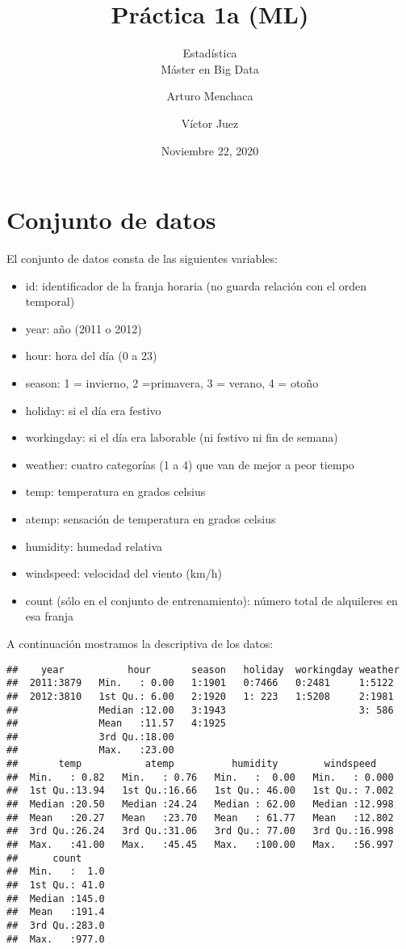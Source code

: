 \documentclass[
]{article}
\title{Práctica 1a (ML)}
\subtitle{Estadística\\
Máster en Big Data}
\author{Arturo Menchaca \and Víctor Juez}
\date{Noviembre 22, 2020}
\providecommand{\tightlist}{%
  \setlength{\itemsep}{0pt}\setlength{\parskip}{0pt}}
\begin{document}
\maketitle

\newpage
\tableofcontents
\newpage

\hypertarget{conjunto-de-datos}{%
\section{Conjunto de datos}\label{conjunto-de-datos}}

El conjunto de datos consta de las siguientes variables:

\begin{itemize}
\tightlist
\item
  id: identificador de la franja horaria (no guarda relación con el
  orden temporal)
\item
  year: año (2011 o 2012)
\item
  hour: hora del día (0 a 23)
\item
  season: 1 = invierno, 2 =primavera, 3 = verano, 4 = otoño
\item
  holiday: si el día era festivo
\item
  workingday: si el día era laborable (ni festivo ni fin de semana)
\item
  weather: cuatro categorías (1 a 4) que van de mejor a peor tiempo
\item
  temp: temperatura en grados celsius
\item
  atemp: sensación de temperatura en grados celsius
\item
  humidity: humedad relativa
\item
  windspeed: velocidad del viento (km/h)
\item
  count (sólo en el conjunto de entrenamiento): número total de
  alquileres en esa franja
\end{itemize}

A continuación mostramos la descriptiva de los datos:

\begin{verbatim}
##    year           hour       season   holiday  workingday weather 
##  2011:3879   Min.   : 0.00   1:1901   0:7466   0:2481     1:5122  
##  2012:3810   1st Qu.: 6.00   2:1920   1: 223   1:5208     2:1981  
##              Median :12.00   3:1943                       3: 586  
##              Mean   :11.57   4:1925                               
##              3rd Qu.:18.00                                        
##              Max.   :23.00                                        
##       temp           atemp          humidity        windspeed     
##  Min.   : 0.82   Min.   : 0.76   Min.   :  0.00   Min.   : 0.000  
##  1st Qu.:13.94   1st Qu.:16.66   1st Qu.: 46.00   1st Qu.: 7.002  
##  Median :20.50   Median :24.24   Median : 62.00   Median :12.998  
##  Mean   :20.27   Mean   :23.70   Mean   : 61.77   Mean   :12.802  
##  3rd Qu.:26.24   3rd Qu.:31.06   3rd Qu.: 77.00   3rd Qu.:16.998  
##  Max.   :41.00   Max.   :45.45   Max.   :100.00   Max.   :56.997  
##      count      
##  Min.   :  1.0  
##  1st Qu.: 41.0  
##  Median :145.0  
##  Mean   :191.4  
##  3rd Qu.:283.0  
##  Max.   :977.0
\end{verbatim}
\end{document}
